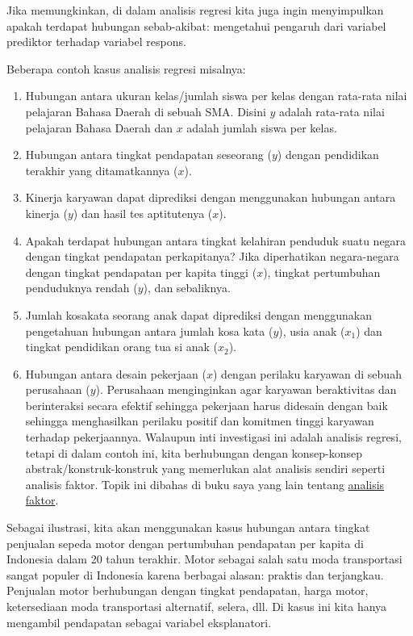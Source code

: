 \documentclass[
]{book}
\providecommand{\tightlist}{%
  \setlength{\itemsep}{0pt}\setlength{\parskip}{0pt}}
\begin{document}
Jika memungkinkan, di dalam analisis regresi kita juga ingin
menyimpulkan apakah terdapat hubungan sebab-akibat: mengetahui pengaruh
dari variabel prediktor terhadap variabel respons.

Beberapa contoh kasus analisis regresi misalnya:

\begin{enumerate}
\def\labelenumi{\arabic{enumi}.}
\tightlist
\item
  Hubungan antara ukuran kelas/jumlah siswa per kelas dengan rata-rata
  nilai pelajaran Bahasa Daerah di sebuah SMA. Disini \(y\) adalah
  rata-rata nilai pelajaran Bahasa Daerah dan \(x\) adalah jumlah siswa
  per kelas.
\item
  Hubungan antara tingkat pendapatan seseorang (\(y\)) dengan pendidikan
  terakhir yang ditamatkannya (\(x\)).
\item
  Kinerja karyawan dapat diprediksi dengan menggunakan hubungan antara
  kinerja (\(y\)) dan hasil tes aptitutenya (\(x\)).
\item
  Apakah terdapat hubungan antara tingkat kelahiran penduduk suatu
  negara dengan tingkat pendapatan perkapitanya? Jika diperhatikan
  negara-negara dengan tingkat pendapatan per kapita tinggi (\(x\)),
  tingkat pertumbuhan penduduknya rendah (\(y\)), dan sebaliknya.
\item
  Jumlah kosakata seorang anak dapat diprediksi dengan menggunakan
  pengetahuan hubungan antara jumlah kosa kata (\(y\)), usia anak
  (\(x_1\)) dan tingkat pendidikan orang tua si anak (\(x_2\)).
\item
  Hubungan antara desain pekerjaan (\(x\)) dengan perilaku karyawan di
  sebuah perusahaan (\(y\)). Perusahaan menginginkan agar karyawan
  beraktivitas dan berinteraksi secara efektif sehingga pekerjaan
  harus didesain dengan baik sehingga menghasilkan perilaku positif
  dan komitmen tinggi karyawan terhadap pekerjaannya. Walaupun inti
  investigasi ini adalah analisis regresi, tetapi di dalam contoh ini,
  kita berhubungan dengan konsep-konsep abstrak/konstruk-konstruk yang
  memerlukan alat analisis sendiri seperti analisis faktor. Topik ini
  dibahas di buku saya yang lain tentang \href{https://bangtedy.github.io/analisisfaktor/}{analisis faktor}.
\end{enumerate}

Sebagai ilustrasi, kita akan menggunakan kasus hubungan antara tingkat
penjualan sepeda motor dengan pertumbuhan pendapatan per kapita di
Indonesia dalam 20 tahun terakhir. Motor sebagai salah satu moda
transportasi sangat populer di Indonesia karena berbagai alasan: praktis
dan terjangkau. Penjualan motor berhubungan dengan tingkat pendapatan,
harga motor, ketersediaan moda transportasi alternatif, selera, dll. Di
kasus ini kita hanya mengambil pendapatan sebagai variabel eksplanatori.
\end{document}
